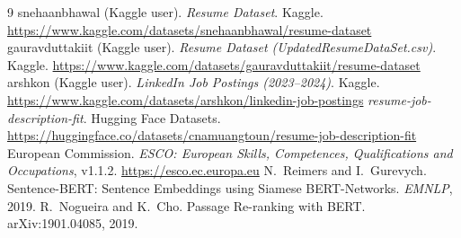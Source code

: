 \documentclass[11pt,a4paper]{article}
\begin{document}
\begin{thebibliography}{9}\small
{} snehaanbhawal (Kaggle user). \emph{Resume Dataset}. Kaggle.
\url{https://www.kaggle.com/datasets/snehaanbhawal/resume-dataset}
 gauravduttakiit (Kaggle user). \emph{Resume Dataset
(UpdatedResumeDataSet.csv)}. Kaggle. \url{https://www.kaggle.com/datasets/gauravduttakiit/resume-dataset}
 arshkon (Kaggle user). \emph{LinkedIn Job Postings (2023--2024)}. Kaggle.
\url{https://www.kaggle.com/datasets/arshkon/linkedin-job-postings}
 \emph{resume-job-description-fit}. Hugging Face Datasets.
\url{https://huggingface.co/datasets/cnamuangtoun/resume-job-description-fit}
 European Commission. \emph{ESCO: European Skills, Competences, Qualifications
and Occupations}, v1.1.2. \url{https://esco.ec.europa.eu}
 N.~Reimers and I.~Gurevych. Sentence-BERT: Sentence Embeddings using Siamese
BERT-Networks. \emph{EMNLP}, 2019.
 R.~Nogueira and K.~Cho. Passage Re-ranking with BERT. arXiv:1901.04085, 2019.
\end{thebibliography}
\end{document}
